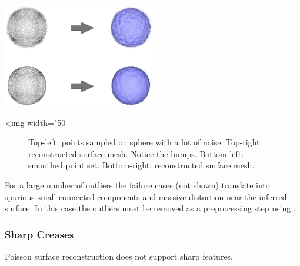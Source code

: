 \begin{center}
    \label{Surface_reconstruction_points_3-fig-noise}
    \begin{ccTexOnly}
      \includegraphics[width=0.5\textwidth]{Surface_reconstruction_points_3/noise} %
    \end{ccTexOnly}
    \begin{ccHtmlOnly}
        <img width="50%
    \end{ccHtmlOnly}
    \begin{figure}[h]
        \caption{Top-left: points sampled on sphere with a lot of noise.
                 Top-right: reconstructed surface mesh. Notice the bumps.
                 Bottom-left: smoothed point set.
                 Bottom-right: reconstructed surface mesh.}
    \end{figure}
\end{center}

For a large number of outliers the failure cases (not shown) translate into spurious small connected components and massive distortion near the inferred surface. In this case the outliers must be removed as a preprocessing step using .


\subsubsection{Sharp Creases}

Poisson surface reconstruction does not support sharp features.


